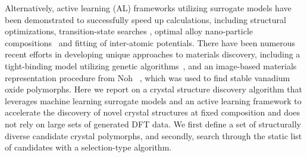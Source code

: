 %
Alternatively, active learning (AL) frameworks utilizing surrogate models have been demonstrated to successfully speed up  calculations, including structural optimizations\cite{hansen2019atomistic}, transition-state searches \cite{torres2019low}, optimal alloy nano-particle compositions~\cite{Jennings2019} and fitting of inter-atomic potentials.\cite{podryabinkin2017active}
%
There have been numerous recent efforts in developing unique approaches to materials discovery, including a tight-binding model utilizing genetic algorithms~\cite{VanDenBossche2018}, and an image-based materials representation procedure from Noh ~\cite{noh2019inverse}, which was used to find stable vanadium oxide polymorphs.
%
%
Here we report on a crystal structure discovery algorithm that leverages machine learning surrogate models and an active learning framework to accelerate the discovery of novel crystal structures at fixed composition and does not rely on large sets of generated DFT data.
%
%
We first define a set of structurally diverse candidate crystal polymorphs, and secondly, search through the static list of candidates with a selection-type algorithm.
%
%
%
%

